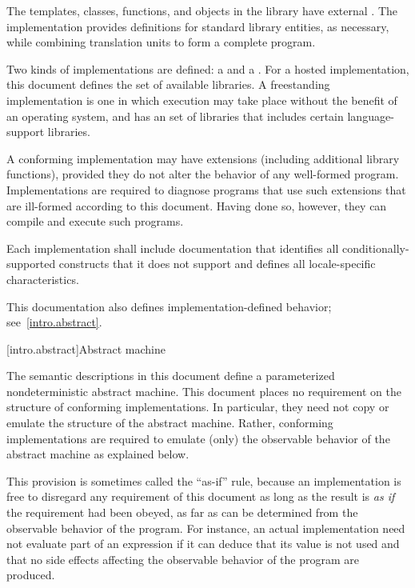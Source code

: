 \pnum
The templates, classes, functions, and objects in the library have
external . The implementation provides
definitions for standard library entities, as necessary, while combining
translation units to form a complete \Cpp{}  program.%

\pnum
Two kinds of implementations are defined: a  and a
. For a hosted implementation, this
document defines the set of available libraries. A freestanding
implementation is one in which execution may take place without the benefit of
an operating system, and has an  set of libraries that includes certain language-support
libraries.

\pnum
A conforming implementation may have extensions (including
additional library functions), provided they do not alter the
behavior of any well-formed program.
Implementations are required to diagnose programs that use such
extensions that are ill-formed according to this document.
Having done so, however, they can compile and execute such programs.

\pnum
Each implementation shall include documentation that identifies all
conditionally-supported constructs
that it does not support and defines all locale-specific characteristics.
\begin{footnote}
This documentation also defines implementation-defined behavior;
see~\ref{intro.abstract}.
\end{footnote}
%
%

[intro.abstract]{Abstract machine}

\pnum
{}%
%
The semantic descriptions in this document define a
parameterized nondeterministic abstract machine. This document
places no requirement on the structure of conforming
implementations. In particular, they need not copy or emulate the
structure of the abstract machine.
%
%
Rather, conforming implementations are required to emulate (only) the observable
behavior of the abstract machine as explained below.
\begin{footnote}
This provision is
sometimes called the ``as-if'' rule, because an implementation is free to
disregard any requirement of this document as long as the result
is \emph{as if} the requirement had been obeyed, as far as can be determined
from the observable behavior of the program. For instance, an actual
implementation need not evaluate part of an expression if it can deduce that its
value is not used and that no
%
side effects affecting the
observable behavior of the program are produced.
\end{footnote}

